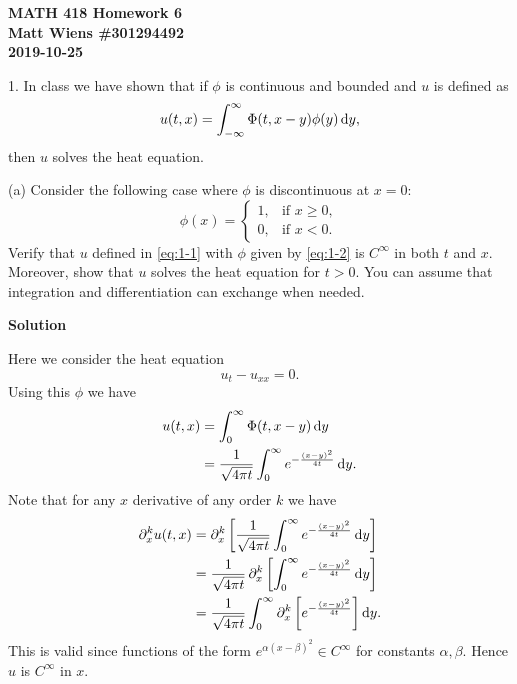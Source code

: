 \documentclass{article}
\begin{document}
\textbf{MATH 418 Homework 6} \\
\textbf{Matt Wiens \#301294492} \\
\textbf{2019-10-25}

1. In class we have shown that if $\phi$ is continuous and bounded and
$u$ is defined as
%
\begin{equation}
    u(t, x) = \int_{-\infty}^\infty \Phi(t, x - y) \phi(y) \dif y
    ,
    \label{eq:1-1}
\end{equation}
%
then $u$ solves the heat equation.

(a) Consider the following case where $\phi$ is discontinuous at
$x = 0$:
%
\begin{equation}
    \phi(x) =
        \begin{cases}
            1, & \text{if } x \geq 0, \\
            0, & \text{if } x < 0.
        \end{cases}
    \label{eq:1-2}
\end{equation}
%
Verify that $u$ defined in \eqref{eq:1-1} with $\phi$ given by
\eqref{eq:1-2} is $C^\infty$ in both $t$ and $x$. Moreover, show that
$u$ solves the heat equation for $t > 0$. You can assume that
integration and differentiation can exchange when needed.

\textbf{Solution}

Here we consider the heat equation
%
\begin{equation}
    u_t - u_{xx} = 0
    .
    \label{eq:1-heat}
\end{equation}
%
Using this $\phi$ we have
%
\begin{align*}
    u(t, x)
        &= \int_0^\infty \Phi(t, x - y) \dif y \\
        &= \frac{1}{\sqrt{4 \pi t}} \int_0^\infty e^{-\frac{(x - y)^2}{4t }} \dif y
        .
\end{align*}
%
Note that for any $x$ derivative of any order $k$ we have
%
\begin{align*}
    \partial_x^k u(t, x)
        &= \partial_x^k \sbr{\frac{1}{\sqrt{4 \pi t}} \int_0^\infty e^{-\frac{(x - y)^2}{4t }} \dif y} \\
        &= \frac{1}{\sqrt{4 \pi t}} \, \partial_x^k \sbr{\int_0^\infty e^{-\frac{(x - y)^2}{4t }} \dif y} \\
        &= \frac{1}{\sqrt{4 \pi t}} \int_0^\infty \partial_x^k \sbr{ e^{-\frac{(x - y)^2}{4t }} } \dif y
        .
\end{align*}
%
This is valid since functions of the form
$e^{\alpha (x - \beta)^2} \in C^\infty$ for constants $\alpha, \beta$.
Hence $u$ is $C^\infty$ in $x$.
\end{document}

